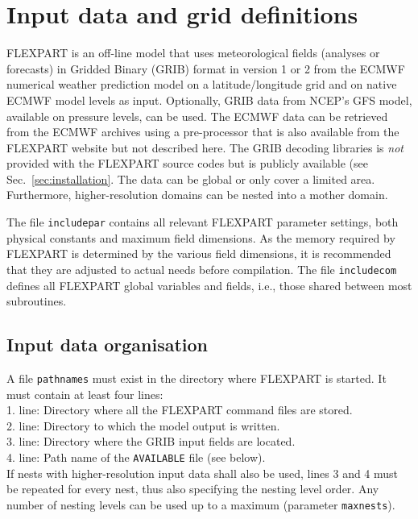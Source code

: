 \documentclass{egu}            %
\begin{document}
\section{Input data and grid definitions}

FLEXPART is an off-line model that uses meteorological fields (analyses or
forecasts) in Gridded Binary (GRIB) format in version 1 or 2 from the ECMWF
numerical weather prediction model \citep{ecmwf1995} on a latitude/longitude
grid and on native ECMWF model levels as input.  Optionally, GRIB data from 
NCEP's GFS model, available on pressure levels, can be used.  The ECMWF data
can be retrieved from the ECMWF archives using a pre-processor that is also
available from the FLEXPART website but not described here.  The GRIB decoding
libraries is {\it not} provided with the FLEXPART source codes but is publicly
available (see Sec.~\ref{sec:installation}.  The data can be global or only
cover a limited area.  Furthermore, higher-resolution domains can be nested
into a mother domain.

The file \verb|includepar| contains all relevant FLEXPART parameter settings,
both physical constants and maximum field dimensions.  As the memory required
by FLEXPART is determined by the various field dimensions, it is recommended
that they are adjusted to actual needs before compilation.  The file
\verb|includecom| defines all FLEXPART global variables and fields, i.e., those
shared between most subroutines.

\subsection{Input data organisation}

A file \verb|pathnames| must exist in the directory where FLEXPART is started.
It must contain at least four lines:\\ 1.  line: Directory where all the
FLEXPART command files are stored.\\ 2.  line: Directory to which the model
output is written.\\ 3.  line: Directory where the GRIB input fields are
located.\\ 4.  line: Path name of the \verb|AVAILABLE| file (see below).\\ If
nests with higher-resolution input data shall also be used, lines 3 and 4 must
be repeated for every nest, thus also specifying the nesting level order.  Any
number of nesting levels can be used up to a maximum (parameter
\verb|maxnests|).
\end{document}

